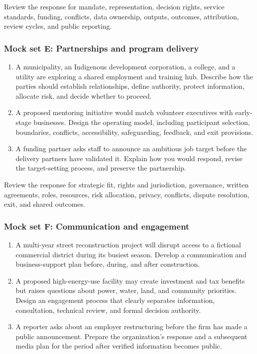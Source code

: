 \documentclass[11pt,letterpaper,oneside,openany]{book}
\begin{document}
Review the response for mandate, representation, decision rights, service standards, funding, conflicts, data ownership, outputs, outcomes, attribution, review cycles, and public reporting.


\subsubsection[Mock set E: Partnerships and program delivery]{Mock set E: Partnerships and program delivery}
\begin{enumerate}
\item A municipality, an Indigenous development corporation, a college, and a utility are exploring a shared employment and training hub. Describe how the parties should establish relationships, define authority, protect information, allocate risk, and decide whether to proceed.
\item A proposed mentoring initiative would match volunteer executives with early-stage businesses. Design the operating model, including participant selection, boundaries, conflicts, accessibility, safeguarding, feedback, and exit provisions.
\item A funding partner asks staff to announce an ambitious job target before the delivery partners have validated it. Explain how you would respond, revise the target-setting process, and preserve the partnership.
\end{enumerate}


Review the response for strategic fit, rights and jurisdiction, governance, written agreements, roles, resources, risk allocation, privacy, conflicts, dispute resolution, exit, and shared outcomes.


\subsubsection[Mock set F: Communication and engagement]{Mock set F: Communication and engagement}
\begin{enumerate}
\item A multi-year street reconstruction project will disrupt access to a fictional commercial district during its busiest season. Develop a communication and business-support plan before, during, and after construction.
\item A proposed high-energy-use facility may create investment and tax benefits but raises questions about power, water, land, and community priorities. Design an engagement process that clearly separates information, consultation, technical review, and formal decision authority.
\item A reporter asks about an employer restructuring before the firm has made a public announcement. Prepare the organization's response and a subsequent media plan for the period after verified information becomes public.
\end{enumerate}
\end{document}
